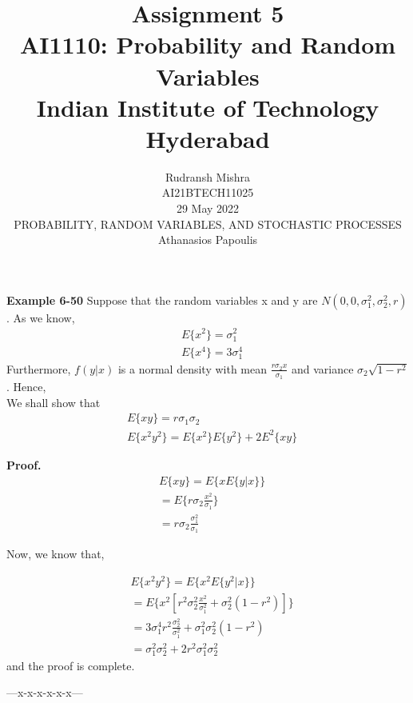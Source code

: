\documentclass[journal,12pt,twocolumn]{IEEEtran}
\title{Assignment 5 \\ \Large AI1110: Probability and Random Variables \\ \large Indian Institute of Technology Hyderabad}
\author{Rudransh Mishra \\ \normalsize AI21BTECH11025 \\ \vspace*{20pt} \normalsize  29 May 2022 \\ \vspace*{20pt} PROBABILITY, RANDOM VARIABLES, AND STOCHASTIC PROCESSES\\ \normalsize Athanasios Papoulis}
\begin{document}
\maketitle

\textbf{Example 6-50}
Suppose that the random variables x and y are $N(0,0,\sigma _1 ^2,\sigma _2 ^2, r)$. As we know,
\begin {align}
  & E\{x^2\}=\sigma _1 ^2\\
  & E\{x^4\}=3 \sigma _1 ^4 
\end {align}
Furthermore, $f (y  | x)$ is a normal density with mean $\frac {r \sigma _2 x}{\sigma _1}$ and variance $\sigma _2 \sqrt {1 - r^2}$. Hence,\\

We shall show that
\begin {align}
  &E\{xy\} = r\sigma _1\sigma _2\\
  &E\{x^2 y^2\} = E\{x^2\}E\{y^2\} + 2E^2\{xy\}
\end {align}

\textbf{Proof.}
\begin {align}
&E\{xy\} =E\{xE\{y|x\}\} \\
&=E\{r \sigma_2 \frac{x^ 2} {\sigma_1} \} \\
&=r \sigma_2 \frac{\sigma_1 ^ 2}{\sigma_1}
\end {align}

Now, we know that,

\begin {align}
&E\{x^ 2 y^ 2 \} =E\{x^ 2 E\{y^ 2 |x\} \}\\ 
&=E\{x^ 2 [r^ 2 \sigma_2 ^ 2\frac{ x^ 2} {\sigma_1 ^ 2} + \sigma_2 ^ 2 (1-r^ 2 )]\}\\
&=3 \sigma_1 ^ 4 r^ 2 \frac{\sigma_2 ^ 2} {\sigma_1 ^ 2} + \sigma_1 ^ 2 \sigma_2 ^ 2 (1-r^ 2 )\\
&= \sigma_1 ^ 2 \sigma_2 ^ 2 +2r^ 2 \sigma_1 ^ 2 \sigma_2 ^ 2
\end {align}
and the proof is complete.

\begin{center} ---x-x-x-x-x-x--- \end{center}
\end{document}
